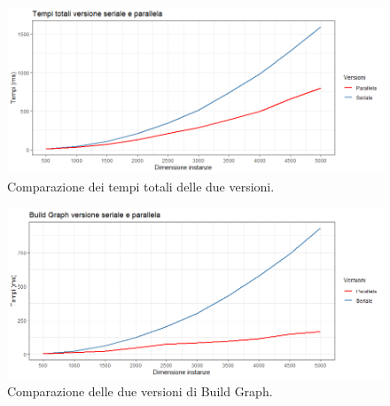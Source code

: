 \documentclass[12pt]{article}
\begin{document}
    \begin{figure}[h]
        \includegraphics[scale=0.7]{total_times_comparison.png}
        \caption{Comparazione dei tempi totali delle due versioni.}
        \label{fig:tempitotali}
    \end{figure}

    \begin{figure}[h]
        \includegraphics[scale=0.7]{build_graph_comparison.png}
        \caption{Comparazione delle due versioni di Build Graph.}
        \label{fig:buildgraph}
    \end{figure}
    
    \FloatBarrier
\end{document}
